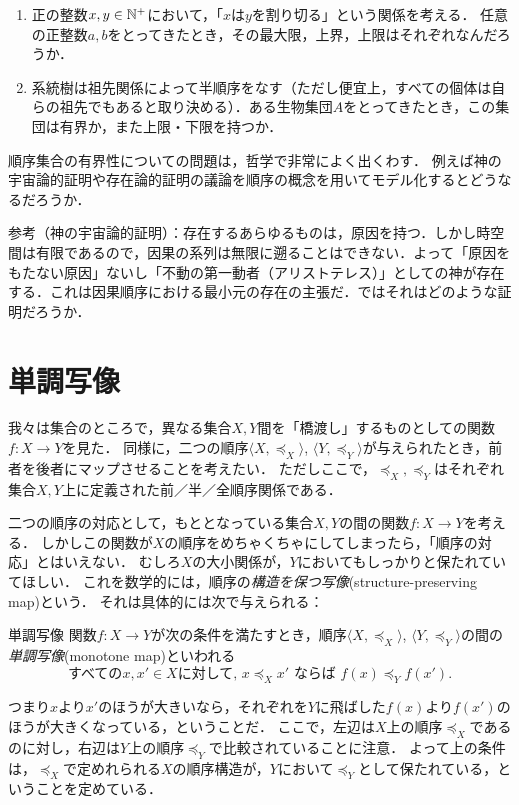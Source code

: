 \documentclass[dvipdfmx,11pt,a4paper]{jsarticle}
\begin{document}
\begin{exercise}
\begin{enumerate}
  \item 正の整数$x, y \in \mathbb{N}^+$において，「$x$は$y$を割り切る」という関係を考える．
  任意の正整数$a,b$をとってきたとき，その最大限，上界，上限はそれぞれなんだろうか．
  \item 系統樹は祖先関係によって半順序をなす（ただし便宜上，すべての個体は自らの祖先でもあると取り決める）．ある生物集団$A$をとってきたとき，この集団は有界か，また上限・下限を持つか．
\end{enumerate}
\end{exercise}


\begin{example}
順序集合の有界性についての問題は，哲学で非常によく出くわす．
例えば神の宇宙論的証明や存在論的証明の議論を順序の概念を用いてモデル化するとどうなるだろうか．

参考（神の宇宙論的証明）：存在するあらゆるものは，原因を持つ．しかし時空間は有限であるので，因果の系列は無限に遡ることはできない．よって「原因をもたない原因」ないし「不動の第一動者（アリストテレス）」としての神が存在する．これは因果順序における最小元の存在の主張だ．ではそれはどのような証明だろうか．
\end{example}


\section{単調写像}
我々は集合のところで，異なる集合$X, Y$間を「橋渡し」するものとしての関数$f:X \to Y$を見た．
同様に，二つの順序$\langle X, \preceq_X \rangle$, $\langle Y, \preceq_Y \rangle$が与えられたとき，前者を後者にマップさせることを考えたい．
ただしここで，$\preceq_X, \preceq_Y$はそれぞれ集合$X,Y$上に定義された前／半／全順序関係である．

二つの順序の対応として，もととなっている集合$X, Y$の間の関数$f:X \to Y$を考える．
しかしこの関数が$X$の順序をめちゃくちゃにしてしまったら，「順序の対応」とはいえない．
むしろ$X$の大小関係が，$Y$においてもしっかりと保たれていてほしい．
これを数学的には，順序の\emph{構造を保つ写像}(structure-preserving map)という．
それは具体的には次で与えられる：
\begin{itembox}[l]{単調写像}
関数$f:X \to Y$が次の条件を満たすとき，順序$\langle X, \preceq_X \rangle$, $\langle Y, \preceq_Y \rangle$の間の\emph{単調写像}(monotone map)といわれる
\[
 \text{すべての}x, x' \in X \text{に対して, }  x \preceq_X x' \text{ ならば } f(x) \preceq_Y f(x').
\]
\end{itembox}
つまり$x$より$x'$のほうが大きいなら，それぞれを$Y$に飛ばした$f(x)$より$f(x')$のほうが大きくなっている，ということだ．
ここで，左辺は$X$上の順序$\preceq_X$であるのに対し，右辺は$Y$上の順序$\preceq_Y$で比較されていることに注意．
よって上の条件は，$\preceq_X$で定めれられる$X$の順序構造が，$Y$において$\preceq_Y$として保たれている，ということを定めている．
\end{document}
